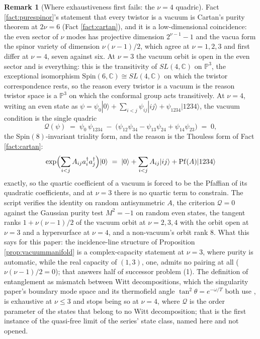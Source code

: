 \documentclass[11pt]{article}
\theoremstyle{definition}
\newtheorem{remark}[theorem]{Remark}
\newcommand{\C}{\mathbb{C}}
\begin{document}
\begin{remark}[Where exhaustiveness first fails: the $\nu = 4$ quadric]\label{rem:quadric}
Fact \ref{fact:purespinor}'s statement that every twistor is a vacuum is Cartan's purity theorem at $2\nu = 6$ (Fact \ref{fact:cartan}), and it is a low-dimensional coincidence: the even sector of $\nu$ modes has projective dimension $2^{\nu - 1} - 1$ and the vacua form the spinor variety of dimension $\nu(\nu - 1)/2$, which agree at $\nu = 1, 2, 3$ and first differ at $\nu = 4$, seven against six. At $\nu = 3$ the vacuum orbit is open in the even sector and is everything: this is the transitivity of $SL(4, \C)$ on $\mathbb{P}^{3}$, the exceptional isomorphism $\mathrm{Spin}(6, \C) \cong SL(4, \C)$ on which the twistor correspondence rests, so the reason every twistor is a vacuum is the reason twistor space is a $\mathbb{P}^{3}$ on which the conformal group acts transitively. At $\nu = 4$, writing an even state as $\psi = \psi_{0}|0\rangle + \sum_{i<j}\psi_{ij}|ij\rangle + \psi_{1234}|1234\rangle$, the vacuum condition is the single quadric
\[
\mathcal{Q}(\psi) \;=\; \psi_{0}\,\psi_{1234} \;-\; \bigl(\psi_{12}\psi_{34} - \psi_{13}\psi_{24} + \psi_{14}\psi_{23}\bigr) \;=\; 0 ,
\]
the $\mathrm{Spin}(8)$-invariant triality form, and the reason is the Thouless form of Fact \ref{fact:cartan}:
\[
\exp\Bigl(\sum_{i<j} A_{ij}a^{\dagger}_{i}a^{\dagger}_{j}\Bigr)|0\rangle \;=\; |0\rangle + \sum_{i<j} A_{ij}|ij\rangle + \mathrm{Pf}(A)|1234\rangle
\]
exactly, so the quartic coefficient of a vacuum is forced to be the Pfaffian of its quadratic coefficients, and at $\nu = 3$ there is no quartic term to constrain. The script verifies the identity on random antisymmetric $A$, the criterion $\mathcal{Q} = 0$ against the Gaussian purity test $M^{2} = -1$ on random even states, the tangent ranks $1 + \nu(\nu - 1)/2$ of the vacuum orbit at $\nu = 2, 3, 4$ with the orbit open at $\nu = 3$ and a hypersurface at $\nu = 4$, and a non-vacuum's orbit rank $8$. What this says for this paper: the incidence-line structure of Proposition \ref{prop:vacuummanifold} is a complex-capacity statement at $\nu = 3$, where purity is automatic, while the real capacity of $(1,3)$, one, admits no pairing at all ($\nu(\nu - 1)/2 = 0$); that answers half of successor problem (1). The definition of entanglement as mismatch between Witt decompositions, which the singularity paper's boundary mode space and its thermofield angle $\tan^{2}\theta = e^{-\omega/T}$ both use \cite[Lem.~7.2, Thm.~7.3]{ButlerT5}, is exhaustive at $\nu \leq 3$ and stops being so at $\nu = 4$, where $\mathcal{Q}$ is the order parameter of the states that belong to no Witt decomposition; that is the first instance of the quasi-free limit of the series' state class, named here and not opened.
\end{remark}
\end{document}
